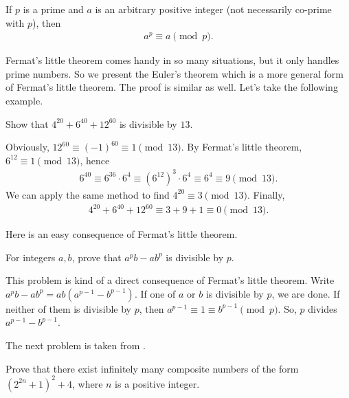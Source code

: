\documentclass{subfile}
\begin{document}
		 \begin{corollary}
		 	If $p$ is a prime and $a$ is an arbitrary positive integer (not necessarily co-prime with $p$), then
		 	\begin{align*}
		 	a^p \equiv a \pmod p.
		 	\end{align*}
		 \end{corollary}
	Fermat's little theorem comes handy in so many situations, but it only handles prime numbers. So we present the Euler's theorem which is a more general form of Fermat's little theorem. The proof is similar as well. Let's take the following example.

		\begin{problem}
			Show that $4^{20} + 6^{40} + 12^{60}$ is divisible by $13$.
		\end{problem}

		\begin{solution}
			Obviously, $12^{60}\equiv (-1)^{60} \equiv 1 \pmod {13}$. By Fermat's little theorem, $6^{12} \equiv 1 \pmod{13}$, hence
				\begin{align*}
					6^{40} \equiv 6^{36} \cdot 6^4 \equiv \left(6^{12}\right)^3 \cdot 6^4 \equiv 6^4 \equiv 9 \pmod{13}.
				\end{align*}
			We can apply the same method to find $4^{20} \equiv 3 \pmod{13}$. Finally,
				\begin{align*}
					4^{20} + 6^{40} + 12^{60} \equiv 3+9+1 \equiv 0 \pmod{13}.
				\end{align*}
		\end{solution}
	Here \textcite[Page $29$, Example $1.29$]{andreescuandricafeng2007} is an easy consequence of Fermat's little theorem.
		\begin{problem}\label{e2}
			For integers $a,b$, prove that $a^pb-ab^p$ is divisible by $p$.
		\end{problem}

		\begin{solution}
			This problem is kind of a direct consequence of Fermat's little theorem. Write $a^pb-ab^p=ab(a^{p-1}-b^{p-1})$. If one of $a$ or $b$ is divisible by $p$, we are done. If neither of them is divisible by $p$, then $a^{p-1}\equiv1\equiv b^{p-1}\pmod p$. So, $p$ divides $a^{p-1}-b^{p-1}$.
		\end{solution}
	The next problem is taken from \cite[Problem $124$]{WaclawSierpinski1964}.
		\begin{problem}
			Prove that there exist infinitely many composite numbers of the form $(2^{2n}+1 )^2+4$, where $n$ is a positive integer.
		\end{problem}
\end{document}
